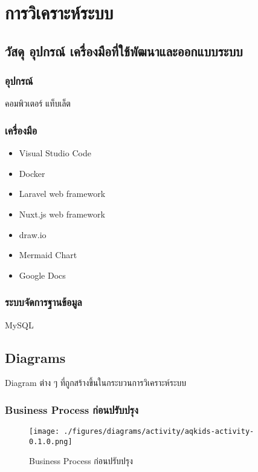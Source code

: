 \section{การวิเคราะห์ระบบ}

\subsection{วัสดุ อุปกรณ์ เครื่องมือที่ใช้พัฒนาและออกแบบระบบ}

\subsubsection{อุปกรณ์}

คอมพิวเตอร์ แท็บเล็ต

\subsubsection{เครื่องมือ}

\begin{itemize}
    \item Visual Studio Code
    \item Docker
    \item Laravel web framework
    \item Nuxt.js web framework
    \item draw.io
    \item Mermaid Chart
    \item Google Docs
\end{itemize}

\subsubsection{ระบบจัดการฐานข้อมูล}

MySQL

\subsection{Diagrams}

Diagram ต่าง ๆ ที่ถูกสร้างขึ้นในกระบวนการวิเคราะห์ระบบ

\subsubsection{Business Process ก่อนปรับปรุง}

\begin{figure}[!htb]
\texttt{[image: ./figures/diagrams/activity/aqkids-activity-0.1.0.png]}
\caption{Business Process ก่อนปรับปรุง}
\label{fig:aqkids-activity-draft}
\end{figure}

